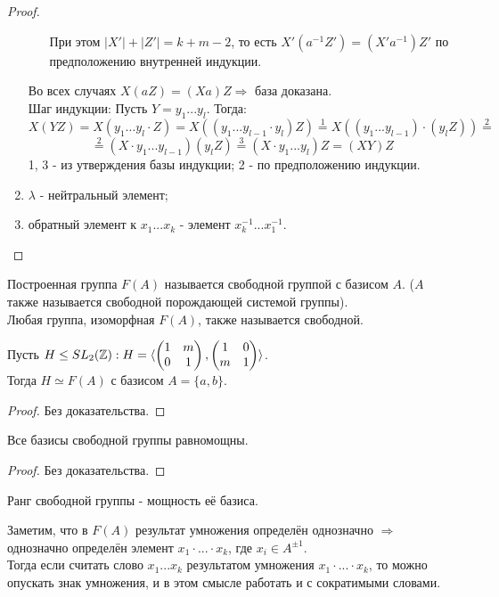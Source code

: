 \begin{proof}
\begin{enumerate}
\begin{itemize}
            При этом $|X'| + |Z'| = k + m - 2$, то есть $X'(a^{-1}Z') = (X'a^{-1})Z'$ по предположению внутренней индукции.
        \end{itemize}
        Во всех случаях $X(aZ) = (Xa)Z \Longrightarrow$ база доказана.\\
        Шаг индукции: Пусть $Y = y_1...y_l$. Тогда:
        \[X(YZ) = X(y_1...y_l\cdot Z) = X((y_1...y_{l-1}\cdot y_l)Z) \overset{1}{=} X((y_1...y_{l-1})\cdot (y_lZ)) \overset{2}{=}\] 
        \[\overset{2}{=} (X\cdot y_1...y_{l-1}) (y_lZ )\overset{3}{=} (X\cdot y_1...y_l)Z = (XY)Z\]
        1, 3 - из утверждения базы индукции; 2 - по предположению индукции.
        \item $\lambda$ - нейтральный элемент;
        \item обратный элемент к $x_1...x_k$ - элемент $x_k^{-1}...x_1^{-1}$.
    \end{enumerate}
\end{proof}
\begin{definition}
    Построенная группа $F(A)$ называется свободной группой с базисом $A$. ($A$ также называется свободной порождающей системой группы).\\
    Любая группа, изоморфная $F(A)$, также называется свободной.
\end{definition}
\begin{subtheorem}
    Пусть $H \leq SL_2(\mathbb{Z}): H = \langle \begin{pmatrix} 1&m\\0&1\end{pmatrix}, \begin{pmatrix} 1&0\\m&1\end{pmatrix} \rangle$.\\
    Тогда $H \simeq F(A)$ с базисом $A = \{a, b\}$.
\end{subtheorem}
\begin{proof}
    Без доказательства.
\end{proof}
\begin{subtheorem}
    Все базисы свободной группы равномощны.
\end{subtheorem}
\begin{proof}
    Без доказательства.
\end{proof}
\begin{definition}
    Ранг свободной группы - мощность её базиса.
\end{definition}
\begin{remark}
    Заметим, что в $F(A)$ результат умножения определён однозначно $\Longrightarrow$ однозначно определён элемент $x_1\cdot ... \cdot x_k$, где $x_i \in A^{\pm 1}$.\\
    Тогда если считать слово $x_1...x_k$ результатом умножения $x_1\cdot ... \cdot x_k$, то можно опускать знак умножения, и в этом смысле работать и с сократимыми словами. 
\end{remark}
